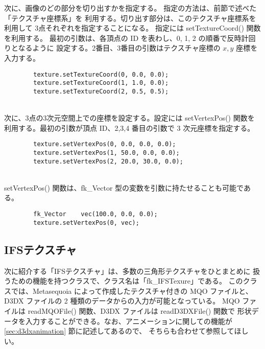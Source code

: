次に、画像のどの部分を切り出すかを指定する。
指定の方法は、前節で述べた「テクスチャ座標系」を
利用する。切り出す部分は、このテクスチャ座標系を利用して
3点それぞれを指定することになる。
指定には setTextureCoord() 関数を利用する。
最初の引数は、各頂点の ID を表わし、0, 1, 2 の順番で反時計回りとなるように
設定する。2番目、3番目の引数はテクスチャ座標の \(x, y\) 座標を入力する。
\\
\begin{screen}
\begin{verbatim}
        texture.setTextureCoord(0, 0.0, 0.0);
        texture.setTextureCoord(1, 1.0, 0.0);
        texture.setTextureCoord(2, 0.5, 0.5);
\end{verbatim}
\end{screen}
~ \\
次に、3点の3次元空間上での座標を設定する。設定には setVertexPos() 関数を
利用する。最初の引数が頂点 ID、2,3,4 番目の引数で 3 次元座標を指定する。
\\
\begin{screen}
\begin{verbatim}
        texture.setVertexPos(0, 0.0, 0.0, 0.0);
        texture.setVertexPos(1, 50.0, 0.0, 0.0);
        texture.setVertexPos(2, 20.0, 30.0, 0.0);
\end{verbatim}
\end{screen}
~ \\
setVertexPos() 関数は、fk\_Vector 型の変数を引数に持たせることも可能である。
\\
\begin{screen}
\begin{verbatim}
        fk_Vector    vec(100.0, 0.0, 0.0);
        texture.setVertexPos(0, vec);
\end{verbatim}
\end{screen}

\subsection{IFSテクスチャ} \label{subsec:ifstexture}
次に紹介する「IFSテクスチャ」は、多数の三角形テクスチャをひとまとめに
扱うための機能を持つクラスで、クラス名は「fk\_IFSTexure」である。
このクラスでは、Metasequoia によって作成したテクスチャ付きの MQO ファイルと、
D3DX ファイルの 2 種類のデータからの入力が可能となっている。
MQO ファイルは readMQOFile() 関数、D3DX ファイルは readD3DXFile() 関数で
形状データを入力することができる。なお、アニメーションに関しての機能が
\ref{sec:d3dxanimation} 節に記述してあるので、
そちらも合わせて参照してほしい。


